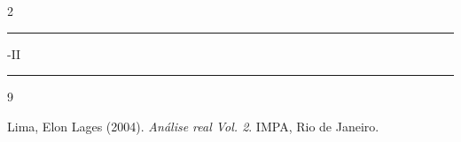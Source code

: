 \documentclass[a4paper, 11pt]{extarticle}
\begin{document}
\begin{multicols}{2}
  \-\vspace{-0.2cm}
  {\hrule \vspace{-0.15cm}
  -II \vspace{0.1cm}
  \hrule}
  \lipsum
  \lipsum


\begin{thebibliography}{9}


Lima, Elon Lages (2004). \textit{An{\'a}lise real Vol. 2}. IMPA, Rio de Janeiro.

\end{thebibliography}

\end{multicols}

\end{document}

